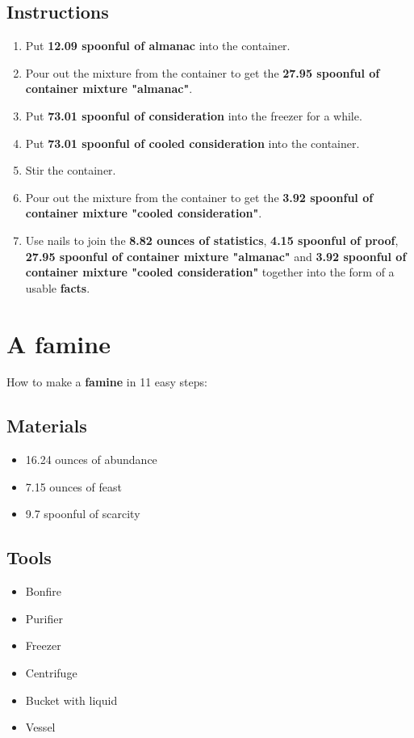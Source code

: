 \documentclass{article}
\begin{document}
\subsection{Instructions}\begin{enumerate}
\item 
Put \textbf{12.09 spoonful of almanac} into the container.
\item 
Pour out the mixture from the container to get the \textbf{27.95 spoonful of container mixture "almanac"}.
\item 
Put \textbf{73.01 spoonful of consideration} into the freezer for a while.
\item 
Put \textbf{73.01 spoonful of cooled consideration} into the container.
\item 
Stir the container.
\item 
Pour out the mixture from the container to get the \textbf{3.92 spoonful of container mixture "cooled consideration"}.
\item 
Use nails to join the \textbf{8.82 ounces of statistics}, \textbf{4.15 spoonful of proof}, \textbf{27.95 spoonful of container mixture "almanac"} and \textbf{3.92 spoonful of container mixture "cooled consideration"} together into the form of a usable \textbf{facts}.
\end{enumerate}
\newpage
\section{A famine}How to make a \textbf{famine} in 11 easy steps:

\subsection{Materials}\begin{itemize}
\item 
16.24 ounces of abundance
\item 
7.15 ounces of feast
\item 
9.7 spoonful of scarcity
\end{itemize}
\subsection{Tools}\begin{itemize}
\item 
Bonfire
\item 
Purifier
\item 
Freezer
\item 
Centrifuge
\item 
Bucket with liquid
\item 
Vessel
\end{itemize}
\end{document}
